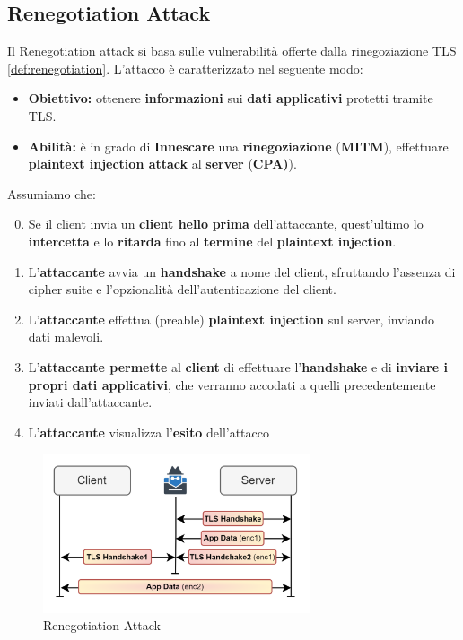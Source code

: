 \subsection{Renegotiation Attack}
Il Renegotiation attack si basa sulle vulnerabilità offerte dalla rinegoziazione TLS \cref{def:renegotiation}. L'attacco è caratterizzato nel seguente modo:
\begin{itemize}
    \item \textbf{Obiettivo:} ottenere \textbf{informazioni} sui \textbf{dati applicativi} protetti tramite TLS.
    \item \textbf{Abilità:} è in grado di \textbf{Innescare} una \textbf{rinegoziazione} (\textbf{MITM}), effettuare \textbf{plaintext injection attack} al \textbf{server} (\textbf{CPA)}).
\end{itemize}
\begin{definition}\label{def:renegoatk}
Assumiamo che:
\begin{enumerate}\setcounter{enumi}{-1}
    \item Se il client invia un \textbf{client hello} \textbf{prima} dell'attaccante, quest'ultimo lo \textbf{intercetta} e lo \textbf{ritarda} fino al \textbf{termine} del \textbf{plaintext injection}.
    \item L'\textbf{attaccante} avvia un \textbf{handshake} a nome del client, sfruttando l'assenza di cipher suite e l'opzionalità dell'autenticazione del client.
    \item L'\textbf{attaccante} effettua (preable) \textbf{plaintext injection} sul server, inviando dati malevoli.
    \item L'\textbf{attaccante permette} al \textbf{client} di effettuare l'\textbf{handshake} e di \textbf{inviare i propri dati applicativi}, che verranno accodati a quelli precedentemente inviati dall'attaccante.
    \item L'\textbf{attaccante} visualizza l'\textbf{esito} dell'attacco\footnotemark
\end{enumerate}
\end{definition}
\begin{figure}[h]
    \centering
    \includegraphics[width=0.7\textwidth]{image/renegoatk.png}
    \caption{Renegotiation Attack}
    \label{fig:renegoatk}
\end{figure}
